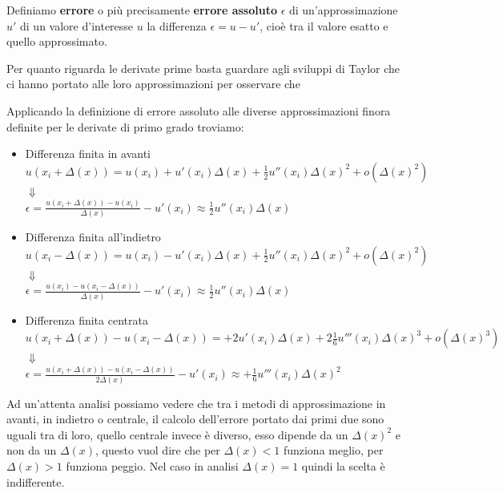 \begin{definizione}
Definiamo \textbf{errore} o più precisamente \textbf{errore assoluto} $\epsilon$ di un'approssimazione $u'$ di un valore d'interesse $u$ la differenza $\epsilon=u-u'$, cioè tra il valore esatto e quello approssimato.
\end{definizione}
Per quanto riguarda le derivate prime basta guardare agli sviluppi di Taylor che ci hanno portato alle loro approssimazioni per osservare che\\
\begin{osservazione}
Applicando la definizione di errore assoluto alle diverse approssimazioni finora definite per le derivate di primo grado troviamo:
\begin{itemize}
    \item Differenza finita in avanti\\
    \centering
    $u(x_i+\Delta(x))=u(x_i)+u'(x_i)\Delta(x)+\frac{1}{2}u''(x_i)\Delta(x)^2+o(\Delta(x)^2)$ \\ $\Downarrow$\\
    $\epsilon=\frac{u(x_i+\Delta(x))-u(x_i)}{\Delta(x)} -u'(x_i)\approx \frac{1}{2}u''(x_i)\Delta(x)$\\
    \raggedright
    \item Differenza finita all'indietro\\
    \centering
    $u(x_i-\Delta(x))=u(x_i)-u'(x_i)\Delta(x)+\frac{1}{2}u''(x_i)\Delta(x)^2+o(\Delta(x)^2)$ \\ $\Downarrow$\\
    $\epsilon=\frac{u(x_i)-u(x_i-\Delta(x))}{\Delta(x)} -u'(x_i)\approx \frac{1}{2}u''(x_i)\Delta(x)$\\
    \raggedright
    \item Differenza finita centrata\\
    \centering
    $u(x_i+\Delta(x))-u(x_i-\Delta(x))=+2u'(x_i)\Delta(x)+2\frac{1}{6}u'''(x_i)\Delta(x)^3+o(\Delta(x)^3)$ \\ $\Downarrow$\\
    $\epsilon=\frac{u(x_i+\Delta(x))-u(x_i-\Delta(x))}{2\Delta(x)} -u'(x_i)\approx +\frac{1}{6}u'''(x_i)\Delta(x)^2$\\
    \raggedright
\end{itemize}
Ad un'attenta analisi possiamo vedere che tra i metodi di approssimazione in avanti, in indietro o centrale, il calcolo dell'errore portato dai primi due sono uguali tra di loro, quello centrale invece è diverso, esso dipende da un $\Delta(x)^2$ e non da un $\Delta(x)$, questo vuol dire che per $\Delta(x)<1$ funziona meglio, per $\Delta(x)>1$ funziona peggio. Nel caso in analisi $\Delta(x)=1$ quindi la scelta è indifferente.
\end{osservazione}
